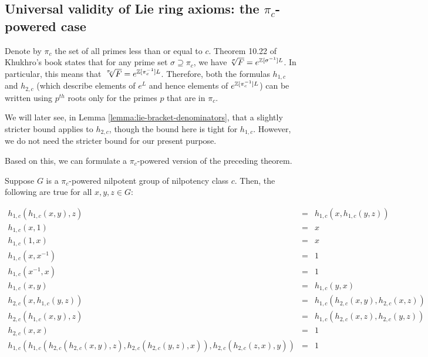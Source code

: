 \subsection{Universal validity of Lie ring axioms: the $\pi_c$-powered case}\label{sec:inverse-bch-pi-powered}

Denote by $\pi_c$ the set of all primes less than or equal to
$c$. Theorem 10.22 of Khukhro's book \cite{Khukhro} states that for
any prime set $\sigma \supseteq \pi_c$, we have $\sqrt[\sigma]{F} =
e^{\mathbb{Z}[\sigma^{-1}]L}$. In particular, this means that $\sqrt[\pi_c]{F} =
e^{\mathbb{Z}[\pi_c^{-1}]L}$. Therefore, both the formulas $h_{1,c}$ and
$h_{2,c}$ (which describe elements of $e^L$ and hence elements of
$e^{\mathbb{Z}[\pi_c^{-1}]L}$) can be written using $p^{th}$ roots only for the
primes $p$ that are in $\pi_c$.

We will later see, in Lemma \ref{lemma:lie-bracket-denominators}, that
a slightly stricter bound applies to $h_{2,c}$, though the bound here
is tight for $h_{1,c}$. However, we do not need the stricter bound
for our present purpose.

Based on this, we can formulate a $\pi_c$-powered version of the preceding theorem.

\begin{theorem}\label{thm:inverse-bch-lie-ring-axiom-universal-validity-pi-powered}
  Suppose $G$ is a $\pi_c$-powered nilpotent group of nilpotency class
  $c$. Then, the following are true for all $x,y,z \in G$:
    
  \begin{eqnarray*}
    h_{1,c}(h_{1,c}(x,y),z) & = & h_{1,c}(x,h_{1,c}(y,z)) \\
    h_{1,c}(x,1) & = & x \\
    h_{1,c}(1,x) & = & x \\
    h_{1,c}(x,x^{-1}) & = & 1 \\
    h_{1,c}(x^{-1},x) & = & 1 \\
    h_{1,c}(x,y) & = & h_{1,c}(y,x)\\
    h_{2,c}(x,h_{1,c}(y,z)) & = & h_{1,c}(h_{2,c}(x,y),h_{2,c}(x,z))\\
    h_{2,c}(h_{1,c}(x,y),z) & = & h_{1,c}(h_{2,c}(x,z),h_{2,c}(y,z))\\
    h_{2,c}(x,x) & = & 1 \\
    h_{1,c}(h_{1,c}(h_{2,c}(h_{2,c}(x,y),z),h_{2,c}(h_{2,c}(y,z),x)),h_{2,c}(h_{2,c}(z,x),y)) & = & 1 \\
  \end{eqnarray*}
\end{theorem}

